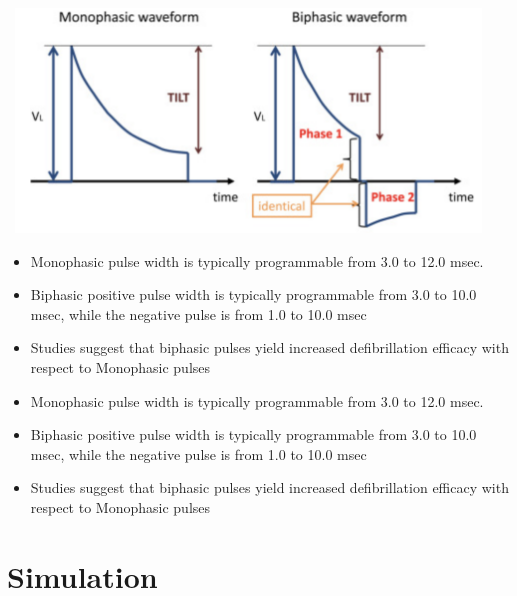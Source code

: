 \documentclass[
  11pt,
  letterpaper,
  DIV=11,
  numbers=noendperiod]{scrreprt}
\providecommand{\tightlist}{%
  \setlength{\itemsep}{0pt}\setlength{\parskip}{0pt}}\usepackage{longtable,booktabs,array}
\begin{document}
\begin{center}
\includegraphics[width=5.03125in,height=2.34375in]{images/clipboard-1322675172.png}
\end{center}

\begin{itemize}
\tightlist
\item
  Monophasic pulse width is typically programmable from 3.0 to 12.0
  msec.
\item
  Biphasic positive pulse width is typically programmable from 3.0 to
  10.0 msec, while the negative pulse is from 1.0 to 10.0 msec
\item
  Studies suggest that biphasic pulses yield increased defibrillation
  efficacy with respect to Monophasic pulses
\item
  Monophasic pulse width is typically programmable from 3.0 to 12.0
  msec.
\item
  Biphasic positive pulse width is typically programmable from 3.0 to
  10.0 msec, while the negative pulse is from 1.0 to 10.0 msec
\item
  Studies suggest that biphasic pulses yield increased defibrillation
  efficacy with respect to Monophasic pulses
\end{itemize}

\section{Simulation}\label{simulation-2}
\end{document}
